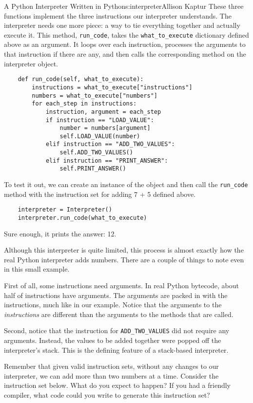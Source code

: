 \begin{aosachapter}{A Python Interpreter Written in Python}{s:interpreter}{Allison Kaptur}
These three functions implement the three instructions our interpreter
understands. The interpreter needs one more piece: a way to tie
everything together and actually execute it. This method,
\texttt{run\_code}, takes the \texttt{what\_to\_execute} dictionary
defined above as an argument. It loops over each instruction, processes
the arguments to that instruction if there are any, and then calls the
corresponding method on the interpreter object.

\begin{verbatim}
    def run_code(self, what_to_execute):
        instructions = what_to_execute["instructions"]
        numbers = what_to_execute["numbers"]
        for each_step in instructions:
            instruction, argument = each_step
            if instruction == "LOAD_VALUE":
                number = numbers[argument]
                self.LOAD_VALUE(number)
            elif instruction == "ADD_TWO_VALUES":
                self.ADD_TWO_VALUES()
            elif instruction == "PRINT_ANSWER":
                self.PRINT_ANSWER()
\end{verbatim}

To test it out, we can create an instance of the object and then call
the \texttt{run\_code} method with the instruction set for adding 7 + 5
defined above.

\begin{verbatim}
    interpreter = Interpreter()
    interpreter.run_code(what_to_execute)
\end{verbatim}

Sure enough, it prints the answer: 12.

Although this interpreter is quite limited, this process is almost
exactly how the real Python interpreter adds numbers. There are a couple
of things to note even in this small example.

First of all, some instructions need arguments. In real Python bytecode,
about half of instructions have arguments. The arguments are packed in
with the instructions, much like in our example. Notice that the
arguments to the \emph{instructions} are different than the arguments to
the methods that are called.

Second, notice that the instruction for \texttt{ADD\_TWO\_VALUES} did
not require any arguments. Instead, the values to be added together were
popped off the interpreter's stack. This is the defining feature of a
stack-based interpreter.

Remember that given valid instruction sets, without any changes to our
interpreter, we can add more than two numbers at a time. Consider the
instruction set below. What do you expect to happen? If you had a
friendly compiler, what code could you write to generate this
instruction set?


\end{aosachapter}
